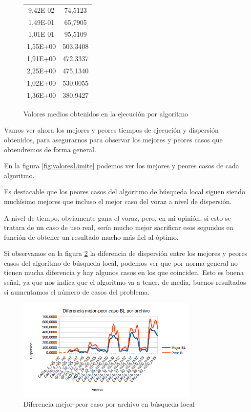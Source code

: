 \begin{figure}[h]
\begin{minipage}[c]{0.32\textwidth}
\begin{tabular}{|c|c|}
            9,42E-02 & 74,5123\\
            1,49E-01 & 65,7905\\
            1,01E-01 & 95,5109\\
            1,55E+00 & 503,3408\\
            1,91E+00 & 472,3337\\
            2,25E+00 & 475,1340\\
            1,02E+00 & 530,0055\\
            1,36E+00 & 380,9427\\
	        \hline
	    \end{tabular}
	\end{minipage}
	\caption{Valores medios obtenidos en la ejecución por algoritmo}
	\label{fig:valoresMedios}
\end{figure}

\newpage

Vamos ver ahora los mejores y peores tiempos de ejecución y dispersión obtenidos, para asegurarnos para observar los mejores y peores casos que obtendremos de forma general.

En la figura \ref{fig:valoresLimite} podemos ver los mejores y peores casos de cada algoritmo.

Es destacable que los peores casos del algoritmo de búsqueda local siguen siendo muchísimo mejores que incluso el mejor caso del voraz a nivel de dispersión.

A nivel de tiempo, obviamente gana el voraz, pero, en mi opinión, si esto se tratara de un caso de uso real, sería mucho mejor sacrificar esos segundos en función de obtener un resultado mucho más fiel al óptimo.

Si observamos en la figura \ref{fig:bestVSworseBL} la diferencia de dispersión entre los mejores y peores casos del algoritmo de búsqueda local, podemos ver que por norma general no tienen mucha diferencia y hay algunos casos en los que coinciden.
Esto es buena señal, ya que nos indica que el algoritmo va a tener, de media, buenos resultados si aumentamos el número de casos del problema.

\begin{figure}[H]
    \centering
	\includegraphics[width=0.8\textwidth]{data/best_vs_worse_bl.png}
	\caption{Diferencia mejor-peor caso por archivo en búsqueda local}
	\label{fig:bestVSworseBL}
\end{figure}

